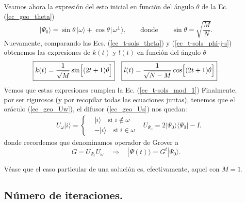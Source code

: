 \documentclass[a4paper,11pt]{book} %
\numberwithin{equation}{chapter}
\def\lch{\left\{}
\def\Lc{\Bigl[}
\def\Rc{\Bigr]}
\def\rqa{\quad \Rightarrow \quad}
\begin{document}
Veamos ahora la expresión del esto inicial en función del ángulo $\theta$ de la Ec. (\ref{ec_geo_theta})
\begin{equation} \label{ec_t-sols_theta}
| \Psi_0 \rangle = \sin \theta \, |\omega \rangle + \cos \theta \, | \omega^{\perp} \rangle, \qquad \text{donde} \qquad  \boxed{\sin \theta = \sqrt{\frac{M}{N}}}.
\end{equation}
Nuevamente, comparando las Ecs. (\ref{ec_t-sols_theta}) y (\ref{ec_t-sols_phi-j-s}) obtenemos las expresiones de $k(t)$ y $l(t)$ en función del ángulo $\theta$
\begin{equation} \label{ec_t-sols_sin-cos}
\begin{aligned} 
& \boxed{k(t) = \frac{1}{\sqrt{M}} \sin \Lc (2t+1) \theta \Rc}
& \boxed{l(t) = \frac{1}{\sqrt{N-M}}\cos \Lc (2t+1) \theta \Rc}.
\end{aligned}
\end{equation}
Vemos que estas expresiones cumplen la Ec. (\ref{ec_t-sols_mod_1}) 
Finalmente, por ser rigurosos (y por recopilar todas las ecuaciones juntas), tenemos que el oráculo (\ref{ec_geo_Uw}), el difusor (\ref{ec_geo_Us}) nos quedan:
\begin{equation} \label{ec_t-sols_Uw_Us}
\begin{aligned} 
& \boxed{U_\omega | i \rangle = 
	\lch
		\begin{matrix}
			& | i \rangle \quad \text{si } i \not \in \omega \\
			& - | i \rangle \quad \text{si } i \in \omega
		\end{matrix}
	\right.}
& \boxed{U_{\Psi_0} = 2 |\Psi_0 \rangle \langle \Psi_0 | - I}.
\end{aligned}
\end{equation}
donde recordemos que denominamos operador de Grover a
\begin{equation} \label{ec_t-sols_G}
\boxed{G = U_{\Psi_0} U_\omega} \rqa |\Psi(t) \rangle =  G^t | \Psi_0 \rangle.
\end{equation}

Véase que el caso particular de una solución es, efectivamente, aquel con $M=1$.

\subsection{Número de iteraciones.}
\end{document}
